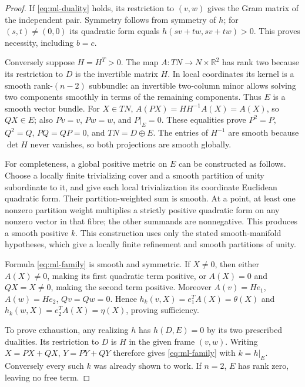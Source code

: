 \begin{proof}
If \eqref{eq:ml-duality} holds, its restriction to $(v,w)$ gives the Gram
matrix of the independent pair. Symmetry follows from symmetry of $h$;
for $(s,t)\ne(0,0)$ its quadratic form equals
$h(sv+tw,sv+tw)>0$. This proves necessity, including $b=c$.

Conversely suppose $H=H^T>0$. The map $A:TN\to N\times\mathbb R^2$
has rank two because its restriction to $D$ is the invertible matrix $H$.
In local coordinates its kernel is a smooth rank-$(n-2)$ subbundle:
an invertible two-column minor allows solving two components smoothly in
terms of the remaining components. Thus $E$ is a smooth vector bundle.
For $X\in TN$, $A(PX)=HH^{-1}A(X)=A(X)$, so $QX\in E$;
also $Pv=v$, $Pw=w$, and $P|_E=0$. These equalities prove
$P^2=P$, $Q^2=Q$, $PQ=QP=0$, and $TN=D\oplus E$.
The entries of $H^{-1}$ are smooth because $\det H$ never vanishes,
so both projections are smooth globally.

For completeness, a global positive metric on $E$ can be constructed as
follows. Choose a locally finite trivializing cover and a smooth partition
of unity subordinate to it, and give each local trivialization its
coordinate Euclidean quadratic form. Their partition-weighted sum is
smooth. At a point, at least one nonzero partition weight multiplies a
strictly positive quadratic form on any nonzero vector in that fibre;
the other summands are nonnegative. This produces a smooth positive $k$.
This construction uses only the stated smooth-manifold hypotheses, which
give a locally finite refinement and smooth partitions of unity.

Formula \eqref{eq:ml-family} is smooth and symmetric. If $X\ne0$, then
either $A(X)\ne0$, making its first quadratic term positive, or
$A(X)=0$ and $QX=X\ne0$, making the second term positive. Moreover
$A(v)=He_1$, $A(w)=He_2$, $Qv=Qw=0$. Hence
$h_k(v,X)=e_1^TA(X)=\theta(X)$ and
$h_k(w,X)=e_2^TA(X)=\eta(X)$, proving sufficiency.

To prove exhaustion, any realizing $h$ has $h(D,E)=0$ by its two prescribed
dualities. Its restriction to $D$ is $H$ in the given frame $(v,w)$.
Writing $X=PX+QX$, $Y=PY+QY$ therefore gives
\eqref{eq:ml-family} with $k=h|_E$. Conversely every such $k$ was already
shown to work. If $n=2$, $E$ has rank zero, leaving no free term.
\end{proof}

